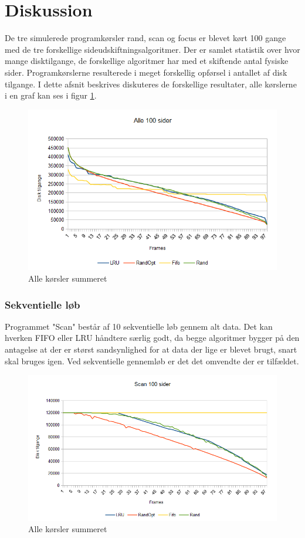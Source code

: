 \section{Diskussion}
De tre simulerede programkørsler rand, scan og focus er blevet kørt 100 gange med de tre forskellige sideudskiftningsalgoritmer. Der er samlet statistik over hvor mange disktilgange, de forskellige algoritmer har med et skiftende antal fysiske sider. Programkørslerne resulterede i meget forskellig opførsel i antallet af disk tilgange. I dette afsnit beskrives diskuteres de forskellige resultater, alle kørslerne i en graf kan ses i figur \ref{fig:all}.

\begin{figure}[ht]
\centerline{\includegraphics[scale=1]{graph/stat_all}}
\FloatBarrier
\caption{Alle kørsler summeret}
\label{fig:all}
\end{figure}

\subsubsection{Sekventielle løb}
Programmet "Scan" består af 10 sekventielle løb gennem alt data. Det kan  hverken FIFO eller LRU håndtere særlig godt, da begge algoritmer bygger på den antagelse at der er størst sandsynlighed for at data der lige er blevet brugt, snart skal bruges igen. Ved sekventielle gennemløb er det det omvendte der er tilfældet. 

\begin{figure}[ht]
\centerline{\includegraphics[scale=1]{graph/stat_scan}}
\FloatBarrier
\caption{Alle kørsler summeret}
\label{fig:scan}
\end{figure}

